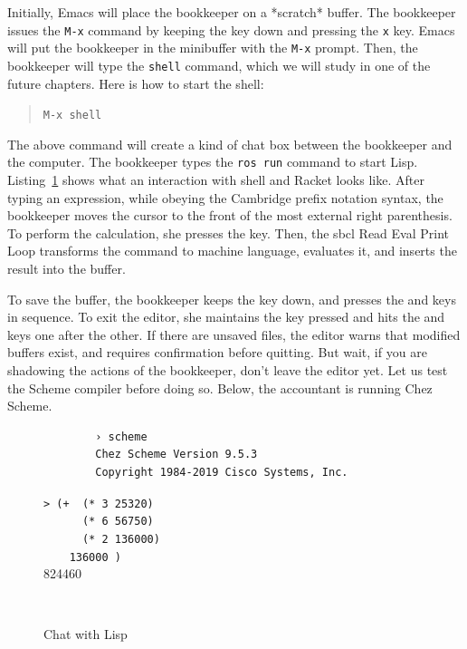 \documentclass[a4paper,12pt]{book}
\newenvironment{fmpage}[1]
{\begin{lrbox}{\fmbox}\begin{minipage}{#1}}
{\end{minipage}\end{lrbox}\fbox{\usebox{\fmbox}}}
\begin{document}
Initially, Emacs will place the bookkeeper
on a *scratch* buffer. The bookkeeper issues
the \verb|M-x| command by keeping the 
key down and pressing the \verb|x| key.
Emacs will put the bookkeeper in the minibuffer
with the \verb|M-x| prompt. Then, the bookkeeper
will type the \verb|shell| command, which we
will study in one of the future chapters.
Here is how to start the shell:
\begin{quote}
	\verb|M-x shell| 
\end{quote}
The above command will create a kind of chat
box between the bookkeeper and the computer.
The bookkeeper types the \verb|ros run| command
to start Lisp.  Listing~\ref{texan:photos} shows
what an interaction with shell and Racket looks
like. After typing an expression, while obeying the
Cambridge prefix notation syntax,
the bookkeeper moves the cursor to the front
of the most external right parenthesis.
To perform the calculation, she presses
the  key. Then, the sbcl Read Eval
Print Loop transforms the command to machine
language, evaluates it, and inserts the result into
the buffer.

To save the buffer, the bookkeeper
keeps the  key down, and presses
the  and  keys in sequence.
To exit the editor, she maintains the 
key pressed and hits the  and 
keys one after the other. If there are unsaved files,
the editor warns that modified buffers exist,
and requires confirmation before quitting. But wait,
if you are shadowing the actions of the bookkeeper,
don't leave the editor yet. Let us test the Scheme
compiler before doing so. Below, the accountant is
running Chez Scheme.

\begin{figure}[!h]
	\begin{fmpage}{0.8\textwidth}
		\begin{verbatim}
		› scheme
		Chez Scheme Version 9.5.3
		Copyright 1984-2019 Cisco Systems, Inc.
		\end{verbatim}
		\verb|> (+  (* 3 25320)|\\
		\verb|      (* 6 56750)|\\
		\verb|      (* 2 136000)|\\
		\verb|    136000 )|\\ 
		824460
	\end{fmpage}
	\begin{fmpage}{0.8\textwidth}
		\verb| |
	\end{fmpage}
	\caption{Chat with Lisp}
	\label{texan:photos}
\end{figure}
\end{document}
